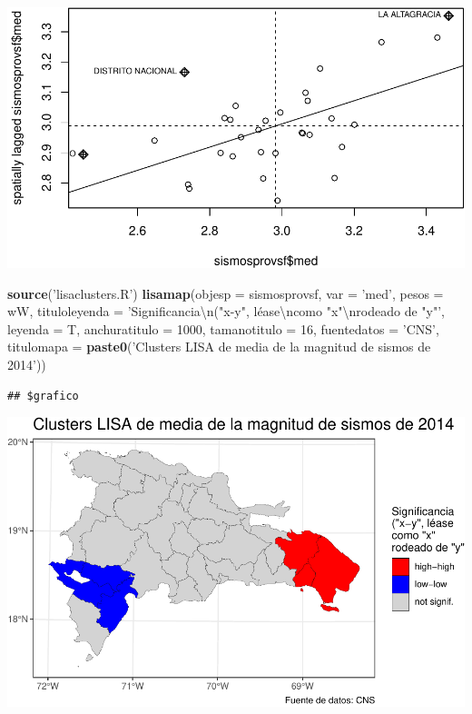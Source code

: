 \documentclass[11pt,]{article}
\newenvironment{Shaded}{\begin{snugshade}}{\end{snugshade}}
\newcommand{\KeywordTok}[1]{\textcolor[rgb]{0.13,0.29,0.53}{\textbf{#1}}}
\newcommand{\DataTypeTok}[1]{\textcolor[rgb]{0.13,0.29,0.53}{#1}}
\newcommand{\DecValTok}[1]{\textcolor[rgb]{0.00,0.00,0.81}{#1}}
\newcommand{\CharTok}[1]{\textcolor[rgb]{0.31,0.60,0.02}{#1}}
\newcommand{\StringTok}[1]{\textcolor[rgb]{0.31,0.60,0.02}{#1}}
\newcommand{\NormalTok}[1]{#1}
\begin{document}
\includegraphics{proyecto_files/figure-latex/unnamed-chunk-14-1.pdf}

\begin{Shaded}
\begin{Highlighting}[]
\KeywordTok{source}\NormalTok{(}\StringTok{'lisaclusters.R'}\NormalTok{)}
\KeywordTok{lisamap}\NormalTok{(}\DataTypeTok{objesp =}\NormalTok{  sismosprovsf,}
        \DataTypeTok{var =} \StringTok{'med'}\NormalTok{,}
        \DataTypeTok{pesos =}\NormalTok{ wW,}
        \DataTypeTok{tituloleyenda =} \StringTok{'Significancia}\CharTok{\textbackslash{}n}\StringTok{("x-y", léase}\CharTok{\textbackslash{}n}\StringTok{como "x"}\CharTok{\textbackslash{}n}\StringTok{rodeado de "y"'}\NormalTok{,}
        \DataTypeTok{leyenda =}\NormalTok{ T,}
        \DataTypeTok{anchuratitulo =} \DecValTok{1000}\NormalTok{,}
        \DataTypeTok{tamanotitulo =} \DecValTok{16}\NormalTok{,}
        \DataTypeTok{fuentedatos =} \StringTok{'CNS'}\NormalTok{,}
        \DataTypeTok{titulomapa =} \KeywordTok{paste0}\NormalTok{(}\StringTok{'Clusters LISA de media de la magnitud de sismos de 2014'}\NormalTok{))}
\end{Highlighting}
\end{Shaded}

\begin{verbatim}
## $grafico
\end{verbatim}

\includegraphics{proyecto_files/figure-latex/unnamed-chunk-14-2.pdf}
\end{document}
